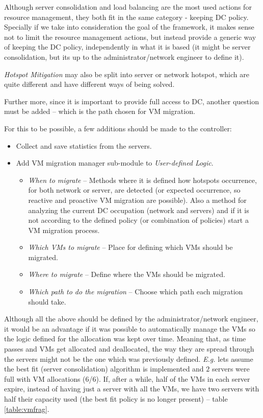 \documentclass[12pt,english,oneside]{book}
\begin{document}
Although server consolidation and load balancing are the most used actions for resource management, they both fit in the same category - keeping DC policy.
Specially if we take into consideration the goal of the framework, it makes sense not to limit the resource management actions, but instead provide a generic way of keeping the DC policy, independently in what it is based (it might be server consolidation, but its up to the administrator/network engineer to define it).

\textit{Hotspot Mitigation} may also be split into server or network hotspot, which are quite different and have different ways of being solved.

Further more, since it is important to provide full access to DC, another question must be added -- which is the path chosen for VM migration.

For this to be possible, a few additions should be made to the controller:
\begin{itemize}
 \item Collect and save statistics from the servers.
 \item Add VM migration manager sub-module to \textit{User-defined Logic}.
 \begin{itemize}
 \item \textit{When to migrate} -- Methods where it is defined how hotspots occurrence, for both network or server, are detected (or expected occurrence, so reactive and proactive VM migration are possible). Also a method for analyzing the current DC occupation (network and servers) and if it is not according to the defined policy (or combination of policies) start a VM migration process.
 \item \textit{Which VMs to migrate} -- Place for defining which VMs should be migrated.
 \item \textit{Where to migrate} -- Define where the VMs should be migrated.
 \item \textit{Which path to do the migration} -- Choose which path each migration should take.
 \end{itemize}
\end{itemize}

\newpage
Although all the above should be defined by the administrator/network engineer, it would be an advantage if it was possible to automatically manage the VMs so the logic defined for the allocation was kept over time. 
Meaning that, as time passes and VMs get allocated and deallocated, the way they are spread through the servers might not be the one which was previously defined.
\textit{E.g.} lets assume the best fit (server consolidation) algorithm is implemented and $2$ servers were full with VM allocations (6/6). If, after a while, half of the VMs in each server expire, instead of having just a server with all the VMs, we have two servers with half their capacity used (the best fit policy is no longer present) -- table \ref{table:vmfrag}.
\end{document}
